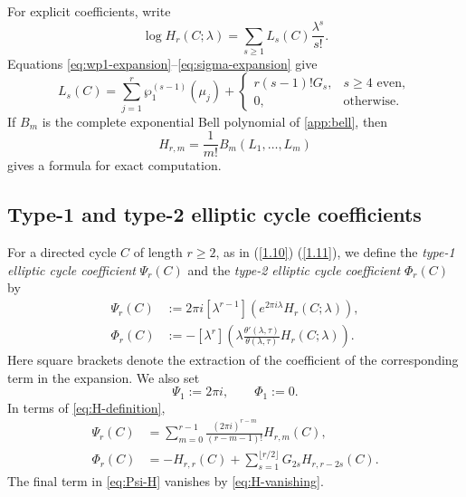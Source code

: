 \documentclass[11pt,a4paper]{amsart}
\numberwithin{equation}{section}
\theoremstyle{definition}
\theoremstyle{remark}
\newcommand{\ii}{i}
\newcommand{\e}{e}
\begin{document}
For explicit coefficients, write
\begin{equation*}
 \log H_r(C;\lambda)=\sum_{s\geq1}L_s(C)\frac{\lambda^s}{s!}.
\end{equation*}
Equations \eqref{eq:wp1-expansion}--\eqref{eq:sigma-expansion} give
\begin{equation}
 L_s(C)=\sum_{j=1}^r\wp_1^{(s-1)}(\mu_j)
 +\begin{cases}
 r(s-1)!G_s,&s\geq4\text{ even},\\
 0,&\text{otherwise}.
 \end{cases}
 \label{eq:L-coefficients}
\end{equation}
If $B_m$ is the complete exponential Bell polynomial of
\cref{app:bell}, then
\begin{equation}
 H_{r,m}=\frac1{m!}B_m(L_1,\ldots,L_m)
 \label{eq:H-Bell}
\end{equation}
gives a formula for exact computation.

\subsection{Type-1 and type-2 elliptic cycle coefficients}

For a directed cycle $C$ of length $r\geq2$, as in (\ref{1.10}) (\ref{1.11}), we define the
\emph{type-1 elliptic cycle coefficient} $\Psi_r(C)$ and the
\emph{type-2 elliptic cycle coefficient} $\Phi_r(C)$ by
\begin{align}
 \Psi_r(C)
 &:=2\pi\ii[\lambda^{r-1}]
 \left(\e^{2\pi\ii\lambda}H_r(C;\lambda)\right),
 \label{eq:Psi-definition}\\
 \Phi_r(C)
 &:=-[\lambda^r]\left(
 \lambda\frac{\theta'(\lambda,\tau)}{\theta(\lambda,\tau)}
 H_r(C;\lambda)\right).
 \label{eq:Phi-definition}
\end{align}
Here square brackets denote the extraction of the coefficient of the corresponding term in the expansion. We also set
\begin{equation*}
 \Psi_1:=2\pi\ii,\qquad \Phi_1:=0.
\end{equation*}
In terms of \eqref{eq:H-definition},
\begin{align}
 \Psi_r(C)&=\sum_{m=0}^{r-1}
 \frac{(2\pi\ii)^{r-m}}{(r-m-1)!}H_{r,m}(C),
 \label{eq:Psi-H}\\
 \Phi_r(C)&=-H_{r,r}(C)
 +\sum_{s=1}^{\lfloor r/2\rfloor}G_{2s}H_{r,r-2s}(C).
 \label{eq:Phi-H}
\end{align}
The final term in \eqref{eq:Psi-H} vanishes by
\eqref{eq:H-vanishing}.
\end{document}
